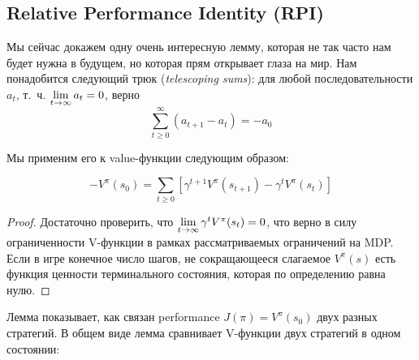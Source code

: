 \subsection{Relative Performance Identity (RPI)}

Мы сейчас докажем одну очень интересную лемму, которая не так часто нам будет нужна в будущем, но которая прям открывает глаза на мир. Нам понадобится следующий трюк (\emph{telescoping sums}): для любой последовательности $a_t$, т.~ч. $\lim\limits_{t \to \infty} a_t \HM= 0$, верно
$$\sum_{t \ge 0}^\infty \left( a_{t+1} - a_t \right) = -a_0$$

Мы применим его к value-функции следующим образом:
\begin{proposition}

\begin{equation}\label{trick}
-V^{\pi}(s_0) = \sum_{t \ge 0} \left[ \gamma^{t+1} V^{\pi}(s_{t+1}) - \gamma^{t} V^{\pi}(s_t) \right]
\end{equation}

\begin{proof} Достаточно проверить, что $\lim\limits_{t \to \infty} \gamma^{t} V^{\pi}(s_t) \HM= 0$, что верно в силу ограниченности V-функции в рамках рассматриваемых ограничений на MDP. Если в игре конечное число шагов, не сокращающееся слагаемое $V^\pi(s)$ есть функция ценности терминального состояния, которая по определению равна нулю.
\end{proof}
\end{proposition}

Лемма показывает, как связан performance $J(\pi) = V^\pi(s_0)$ двух разных стратегий. В общем виде лемма сравнивает V-функции двух стратегий в одном состоянии:


